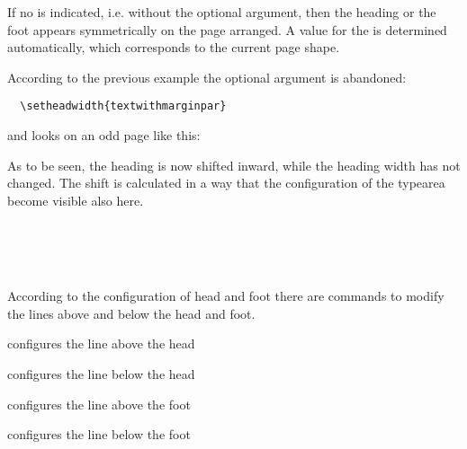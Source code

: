 If no  is indicated,
i.e. without the optional argument, then
the heading or the foot appears symmetrically on the page arranged.
A value for the  is determined automatically, which
corresponds to the current page shape.
%
\begin{Example}
According to the previous example the optional argument is abandoned:
\begin{lstlisting}
  \setheadwidth{textwithmarginpar}
\end{lstlisting}
%
and looks on an odd page like this:
%
\begin{XmpTopPage}
        \thinlines{}
\end{XmpTopPage}
\end{Example}

As to be seen, the heading is now shifted inward, while the
heading width has not changed.
The shift is calculated in a way that the configuration of the typearea
become visible also here.
%

\begin{Declaration}
\\
\\
\\
\end{Declaration}%
According to the configuration of head and foot there are
commands to modify the lines above and below the head and foot.

\begin{labeling}[\,--]{}
\item[\Macro{setheadtopline}] configures the line above the head
\item[\Macro{setheadsepline}] configures the line below the head
\item[\Macro{setfootsepline}] configures the line above the foot
\item[\Macro{setfootbotline}] configures the line below the foot
\end{labeling}

